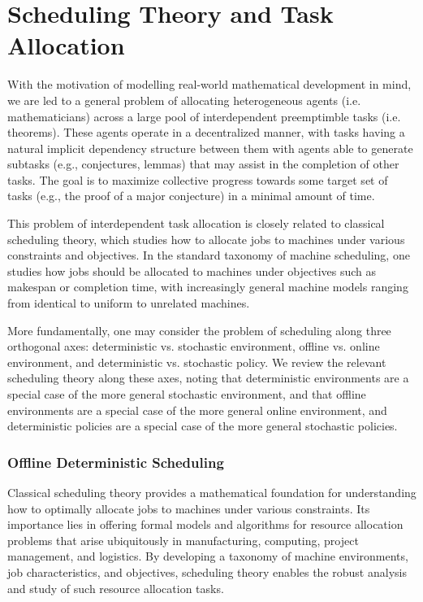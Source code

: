 \chapter{Scheduling Theory and Task Allocation}\label{chap:schedulingtheory}

With the motivation of modelling real-world mathematical development in mind, we are led to a general problem of allocating heterogeneous agents (i.e. mathematicians) across a large pool of interdependent preemptimble tasks (i.e. theorems). These agents operate in a decentralized manner, with tasks having a natural implicit dependency structure between them with agents able to generate subtasks (e.g., conjectures, lemmas) that may assist in the completion of other tasks. The goal is to maximize collective progress towards some target set of tasks (e.g., the proof of a major conjecture) in a minimal amount of time.

This problem of interdependent task allocation is closely related to classical scheduling theory, which studies how to allocate jobs to machines under various constraints and objectives. In the standard taxonomy of machine scheduling, one studies how jobs should be allocated to machines under objectives such as makespan or completion time, with increasingly general machine models ranging from identical to uniform to unrelated machines. 

More fundamentally, one may consider the problem of scheduling along three orthogonal axes: deterministic vs. stochastic environment, offline vs. online environment, and deterministic vs. stochastic policy. We review the relevant scheduling theory along these axes, noting that deterministic environments are a special case of the more general stochastic environment, and that offline environments are a special case of the more general online environment, and deterministic policies are a special case of the more general stochastic policies.


\subsection{Offline Deterministic Scheduling}

Classical scheduling theory provides a mathematical foundation for understanding how to optimally allocate jobs to machines under various constraints. Its importance lies in offering formal models and algorithms for resource allocation problems that arise ubiquitously in manufacturing, computing, project management, and logistics. By developing a taxonomy of machine environments, job characteristics, and objectives, scheduling theory enables the robust analysis and study of such resource allocation tasks.

